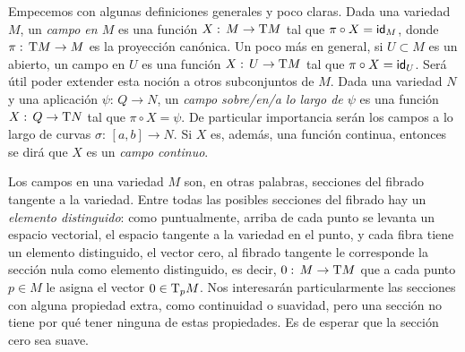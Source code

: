 \theoremstyle{plain}
\newtheorem{teoDerivacionesYCampos}{Teorema}[section]
\newtheorem{propoCamposEnCoordenadas}[teoDerivacionesYCampos]{Poposici\'{o}n}
\newtheorem{propoExtenderUnCampo}[teoDerivacionesYCampos]{Proposici\'{o}n}
\newtheorem{lemaAplicarCamposLocalmenteDeterminado}%
	[teoDerivacionesYCampos]{Lema}
\newtheorem{propoEquivCampoSuave}[teoDerivacionesYCampos]{Proposici\'{o}n}
\newtheorem{propoFRelacionados}[teoDerivacionesYCampos]{Proposici\'{o}n}
\newtheorem{teoPushforwardDifeo}[teoDerivacionesYCampos]{Teorema}
\newtheorem{propoCamposTangentes}[teoDerivacionesYCampos]{Proposici\'{o}n}
\newtheorem{propoTangenteSubvarSubvar}[teoDerivacionesYCampos]{Proposici\'{o}n}
\newtheorem{propoCamposTangentesSuaves}[teoDerivacionesYCampos]%
	{Proposici\'{o}n}
\newtheorem{lemaElCorcheteEsSuave}[teoDerivacionesYCampos]{Lema}
\newtheorem{propoCorcheteFRelacionados}[teoDerivacionesYCampos]%
	{Proposici\'{o}n}
\newtheorem{coroTangentesCorcheteCerrados}[teoDerivacionesYCampos]%
	{Proposici\'{o}n}
\newtheorem{lemaExtenderCampos}[teoDerivacionesYCampos]{Lema}

\theoremstyle{remark}
\newtheorem{obsCamposConstantes}{Observaci\'{o}n}[section]
\newtheorem{obsDerivacionEsDerivacion}[obsCamposConstantes]{Observaci\'{o}n}
\newtheorem{obsFRelacionados}[obsCamposConstantes]{Observaci\'{o}n}
\newtheorem{obsTangenteSubvarReg}[obsCamposConstantes]{Observaci\'{o}n}
\newtheorem{obsCorcheteEnCoords}[obsCamposConstantes]{Observaci\'{o}n}


Empecemos con algunas definiciones generales y poco claras. Dada una
variedad $M$, un \emph{campo en $M$} es una funci\'{o}n
$X:\,M\rightarrow\tangente{M}$ tal que $\pi\circ X=\id[M]$, donde
$\pi:\,\tangente{M}\rightarrow M$ es la proyecci\'{o}n can\'{o}nica.
Un poco m\'{a}s en general, si $U\subset M$ es un abierto, un campo en
$U$ es una funci\'{o}n $X:\,U\rightarrow\tangente{M}$ tal que
$\pi\circ X=\id[U]$. Ser\'{a} \'{u}til poder extender esta noci\'{o}n a
otros subconjuntos de $M$. Dada una variedad $N$ y una aplicaci\'{o}n
$\psi:\,Q\rightarrow N$, un \emph{campo sobre/en/a lo largo de $\psi$} es una
funci\'{o}n $X:\,Q\rightarrow\tangente{N}$ tal que $\pi\circ X=\psi$. De
particular importancia ser\'{a}n los campos a lo largo de curvas
$\sigma:\,[a,b]\rightarrow N$. Si $X$ es, adem\'{a}s, una funci\'{o}n
continua, entonces se dir\'{a} que $X$ es un \emph{campo continuo}.

Los campos en una variedad $M$ son, en otras palabras, secciones del
fibrado tangente a la variedad. Entre todas las posibles secciones
del fibrado hay un \emph{elemento distinguido}: como puntualmente,
arriba de cada punto se levanta un espacio vectorial, el espacio tangente
a la variedad en el punto, y cada fibra tiene un elemento distinguido,
el vector cero, al fibrado tangente le corresponde la secci\'{o}n nula
como elemento distinguido, es decir, $0:\,M\rightarrow\tangente{M}$
que a cada punto $p\in M$ le asigna el vector $0\in\tangente[p]{M}$.
Nos interesar\'{a}n particularmente las secciones con alguna propiedad
extra, como continuidad o suavidad, pero una secci\'{o}n no tiene por qu\'{e}
tener ninguna de estas propiedades. Es de esperar que la secci\'{o}n
cero sea suave.

